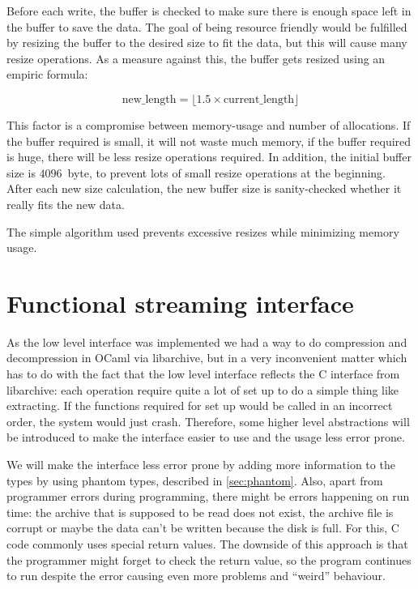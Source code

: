 \documentclass[parskip=half]{scrreprt}
\begin{document}
Before each write, the buffer is checked to make sure there is enough space
left in the buffer to save the data. The goal of being resource friendly would
be fulfilled by resizing the buffer to the desired size to fit the data, but
this will cause many resize operations. As a measure against this, the buffer
gets resized using an empiric formula:

\begin{displaymath}
\text{new\_length} = \lfloor 1.5 \times \text{current\_length} \rfloor
\end{displaymath}

This factor is a compromise between memory-usage and number of allocations. If
the buffer required is small, it will not waste much memory, if the buffer
required is huge, there will be less resize operations required. In addition,
the initial buffer size is $4096$~byte, to prevent lots of small resize
operations at the beginning. After each new size calculation, the new buffer
size is sanity-checked whether it really fits the new data.

The simple algorithm used prevents excessive resizes while minimizing memory
usage.

\section{Functional streaming interface}
\label{sec:functional}

As the low level interface was implemented we had a way to do compression and
decompression in OCaml via libarchive, but in a very inconvenient matter which
has to do with the fact that the low level interface reflects the C interface
from libarchive: each operation require quite a lot of set up to do a simple
thing like extracting. If the functions required for set up would be called in
an incorrect order, the system would just crash. Therefore, some higher level
abstractions will be introduced to make the interface easier to use and the
usage less error prone.

We will make the interface less error prone by adding more information to the
types by using phantom types, described in \autoref{sec:phantom}. Also, apart
from programmer errors during programming, there might be errors happening on
run time: the archive that is supposed to be read does not exist, the archive
file is corrupt or maybe the data can't be written because the disk is full.
For this, C code commonly uses special return values. The downside of this
approach is that the programmer might forget to check the return value, so the
program continues to run despite the error causing even more problems and
\enquote{weird} behaviour.
\end{document}
